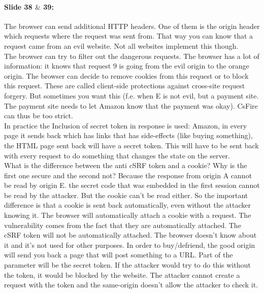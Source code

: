 \documentclass[10pt,a4paper]{report}
\begin{document}
\paragraph{Slide 38 $\&$ 39:} The browser can send additional HTTP headers. One of them is the origin header which requests where the request was sent from. That way you can know that a request came from an evil website. Not all websites implement this though.\\
The browser can try to filter out the dangerous requests. The browser has a lot of information: it knows that request 9 is going from the evil origin to the orange origin. The browser can decide to remove cookies from this request or to block this request. These are called client-side protections against cross-site request forgery. But sometimes you want this (f.e. when E is not evil, but a payment site. The payment site needs to let Amazon know that the payment was okay). CsFire can thus be too strict. \\
In practice the Inclusion of secret token in response is used: Amazon, in every page it sends back which has links that has side-effects (like buying something), the HTML page sent back will have a secret token. This will have to be sent back with every request to do something that changes the state on the server.\\
What is the difference between the anti cSRF token and a cookie? Why is the first one secure and the second not? Because the response from origin A cannot be read by origin E. the secret code that was embedded in the first session cannot be read by the attacker. But the cookie can't be read either. So the important difference is that a cookie is sent back automatically, even without the attacker knowing it. The browser will automatically attach a cookie with a request. The vulnerability comes from the fact that they are automatically attached. The cSRF token will not be automatically attached. The browser doesn't know about it and it's not used for other purposes. In order to buy/defriend, the good origin will send you back a page that will post something to a URL. Part of the parameter will be the secret token. If the attacker would try to do this without the token, it would be blocked by the website. The attacker cannot create a request with the token and the same-origin doesn't allow the attacker to check it. 
\end{document}
